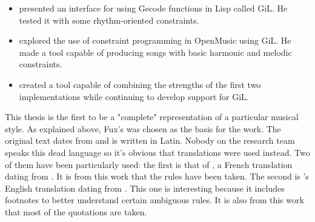 \begin{itemize}
    \item \textcite{GiLthesis} presented an interface for using Gecode functions in Lisp called GiL. He tested it with some rhythm-oriented constraints.
    \item \textcite{Melothesis} explored the use of constraint programming in OpenMusic using GiL. He made a tool capable of producing songs with basic harmonic and melodic constraints.
    \item \textcite{Melo2thesis} created a tool capable of combining the strengths of the first two implementations while continuing to develop support for GiL.
\end{itemize}

This thesis is the first to be a "complete" representation of a particular musical style. As explained above, Fux's  was chosen as the basis for the work. The original text dates from \citeyear{IMSLPlatin} and is written in Latin. Nobody on the research team speaks this dead language so it's obvious that translations were used instead. Two of them have been particularly used: the first is that of \textcite{GaPFr}, a French translation dating from \citeyear{GaPFr}. It is from this work that the rules have been taken. The second is \textcite{GaPEng}'s English translation dating from \citeyear{GaPEng}. This one is interesting because it includes footnotes to better understand certain ambiguous rules. It is also from this work that most of the quotations are taken.